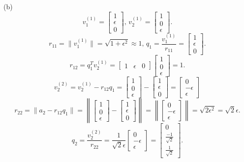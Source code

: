 \documentclass{article}
\begin{document}
(b)\[v_1^{(1)}=\begin{bmatrix}1\\\epsilon\\0\end{bmatrix},\,v_2^{(1)}=\begin{bmatrix}1\\0\\\epsilon\end{bmatrix}.\]
\[r_{11}=\lVert v_1^{(1)}\rVert=\sqrt{1+\epsilon^2}\approx1,\,q_1=\frac{v_1^{(1)}}{r_{11}}=\begin{bmatrix}1\\\epsilon\\0\end{bmatrix}.\]
\[r_{12}=q_1^Tv_2^{(1)}=\begin{bmatrix}1&\epsilon&0\end{bmatrix}\begin{bmatrix}1\\0\\\epsilon\end{bmatrix}=1.\]
\[v_2^{(2)}=v_2^{(1)}-r_{12}q_1=\begin{bmatrix}1\\0\\\epsilon\end{bmatrix}-\begin{bmatrix}1\\\epsilon\\0\end{bmatrix}=\begin{bmatrix}0\\-\epsilon\\\epsilon\end{bmatrix}\]
\[r_{22}=\lVert a_2-r_{12}q_1\rVert=\left\lVert\begin{bmatrix}1\\0\\\epsilon\end{bmatrix}-\begin{bmatrix}1\\\epsilon\\0\end{bmatrix}\right\rVert=\left\lVert\begin{bmatrix}0\\-\epsilon\\\epsilon\end{bmatrix}\right\rVert=\sqrt{2\epsilon^2}=\sqrt2\epsilon.\]
\[q_2=\frac{v_2^{(2)}}{r_{22}}=\frac{1}{\sqrt2\epsilon}\begin{bmatrix}0\\-\epsilon\\\epsilon\end{bmatrix}=\begin{bmatrix}0\\\frac{-1}{\sqrt2}\\\frac{1}{\sqrt2}\end{bmatrix}.\]
\end{document}
